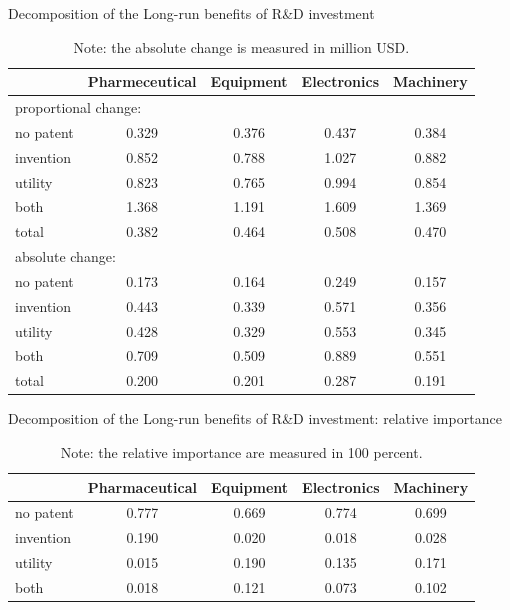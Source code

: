 \documentclass[English]{article}
\begin{document}
\begin{table}[H] %
\centering
\caption{Decomposition of the Long-run benefits of R\&D investment}
\label{T17C}
\begin{tabular}{lcccc}
\hline\hline
              &Pharmeceutical & Equipment & Electronics & Machinery\\
\hline
\multicolumn{5}{l}{proportional change:}                      \\
no patent  & 0.329 & 0.376 & 0.437 & 0.384 \\
invention  & 0.852 & 0.788 & 1.027 & 0.882 \\
utility    & 0.823 & 0.765 & 0.994 & 0.854 \\
both       & 1.368 & 1.191 & 1.609 & 1.369 \\
total      & 0.382 & 0.464 & 0.508 & 0.470  \\
\hline
\multicolumn{5}{l}{absolute change:}                          \\
no patent  & 0.173 & 0.164 & 0.249 & 0.157 \\
invention  & 0.443 & 0.339 & 0.571 & 0.356 \\
utility    & 0.428 & 0.329 & 0.553 & 0.345 \\
both       & 0.709 & 0.509 & 0.889 & 0.551 \\
total      & 0.200 & 0.201 & 0.287 & 0.191 \\
\hline\hline
\end{tabular}
\caption*{\small{}Note: the absolute change is measured in million USD.}{\small \par}
\end{table}



\begin{table}[H] %
\centering
\caption{Decomposition of the Long-run benefits of R\&D investment: relative importance}
\label{T17D}
\begin{tabular}{lcccc}
\hline\hline
              &Pharmaceutical & Equipment & Electronics & Machinery\\
\hline
no patent  & 0.777 & 0.669 & 0.774 & 0.699 \\
invention  & 0.190 & 0.020 & 0.018 & 0.028 \\
utility    & 0.015 & 0.190 & 0.135 & 0.171 \\
both       & 0.018 & 0.121 & 0.073 & 0.102 \\
\hline\hline
\end{tabular}
\caption*{\small{}Note: the relative importance are measured in 100 percent.}{\small \par}
\end{table}
\end{document}
